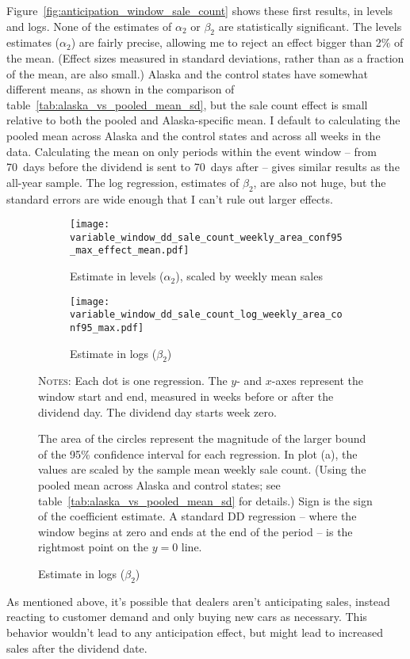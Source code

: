 \documentclass[11pt,letterpaper,oneside]{article}
\newcommand{\varWindowDDnotes}{%
Each dot is one regression.
The $y$- and $x$-axes represent the window start and end, measured in weeks before or after the dividend day.
The dividend day starts week zero.

 The area of the circles represent the magnitude of the larger bound of the 95\% confidence interval for each regression.
In plot (a), the values are scaled by the sample mean weekly sale count.
(Using the pooled mean across Alaska and control states; see table~\ref{tab:alaska_vs_pooled_mean_sd} for details.)
Sign is the sign of the coefficient estimate. %
A standard DD regression -- where the window begins at zero and ends at the end of the period -- is the rightmost point on the $y=0$ line.
}
\begin{document}
\begin{doublespacing}
Figure~\ref{fig:anticipation_window_sale_count} shows these first results, in levels and logs.
None of the estimates of $\alpha_2$ or $\beta_2$ are statistically significant.
The levels estimates ($\alpha_2$) are fairly precise, allowing me to reject an effect bigger than 2\% of the mean.
(Effect sizes measured in standard deviations, rather than as a fraction of the mean, are also small.)
Alaska and the control states have somewhat different means, as shown in the comparison of table~\ref{tab:alaska_vs_pooled_mean_sd}, but the sale count effect is small relative to both the pooled and Alaska\hyp{}specific mean.
I default to calculating the pooled mean across Alaska and the control states and across all weeks in the data.
Calculating the mean on only periods within the event window -- from 70~days before the dividend is sent to 70~days after -- gives similar results as the all\hyp{}year sample.
The log regression, estimates of $\beta_2$, are also not huge, but the standard errors are wide enough that I can't rule out larger effects.

\begin{figure}[!hbt]
    \caption{Sales count effects with varying windows}
    \label{fig:variable_window_sale_count}
    \begin{subfigure}{0.97\linewidth}
        \caption{Estimate in levels ($\alpha_2$), scaled by weekly mean sales}
        \centering
        \texttt{[image: variable\_window\_dd\_sale\_count\_weekly\_area\_conf95\_max\_effect\_mean.pdf]}
    \end{subfigure}
    \begin{subfigure}{0.97\linewidth}
        \caption{Estimate in logs ($\beta_2$)}
        \texttt{[image: variable\_window\_dd\_sale\_count\_log\_weekly\_area\_conf95\_max.pdf]}
    \end{subfigure}

    {\footnotesize
    \textsc{Notes:}
    \varWindowDDnotes
    }
\end{figure}

As mentioned above, it's possible that dealers aren't anticipating sales, instead reacting to customer demand and only buying new cars as necessary.
This behavior wouldn't lead to any anticipation effect, but might lead to increased sales after the dividend date.


\end{doublespacing}
\end{document}
